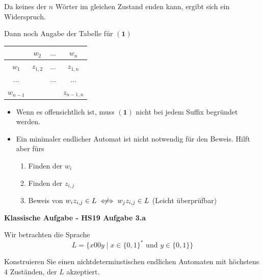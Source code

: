 \documentclass[a4paper, 11pt]{article}
\newcommand\myTitle[1]{{\large \textbf {#1}}}
\begin{document}
        Da keines der $n$ Wörter im gleichen Zustand enden kann, ergibt sich ein Widerspruch.
    
        Dann noch Angabe der Tabelle für $\mathbf{(1)}$
        \begin{table}
            \centering
            \begin{tabular}{c|ccc}
                & $w_2$ & $...$ & $w_n$\\
                \hline
                $w_1$& $z_{1,2}$& ...&$z_{1,n}$\\
                $...$&  & $...$&$...$\\
                $w_{n-1}$& &  & $z_{n-1, n}$
            \end{tabular}
        \end{table}
        \begin{itemize}[label=-]
            \item Wenn es offensichtlich ist, muss $\mathbf{(1)}$ nicht bei jedem Suffix begründet werden.
            \item Ein minimaler endlicher Automat ist nicht notwendig für den Beweis. Hilft aber fürs
            \begin{enumerate}[label=\roman*.]
                \item Finden der $w_i$
                \item Finden der $z_{i, j}$
                \item Beweis von $w_iz_{i,j} \in L \centernot{\iff} w_jz_{i,j} \in L$ (Leicht überprüfbar)
            \end{enumerate}
        \end{itemize}
    
    
    
        \myTitle{Klassische Aufgabe - HS19 Aufgabe 3.a}

        Wir betrachten die Sprache 
        $$L = \{x00y \mid x \in \{0, 1\}^* \text{ und } y \in \{0,1\}\}$$
       
        Konstruieren Sie einen nichtdeterminstischen endlichen Automaten mit höchstens $4$ Zuständen, der $L$ akzeptiert.
        
    
\end{document}

